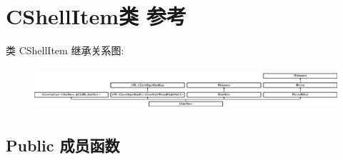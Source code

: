 \hypertarget{class_c_shell_item}{}\section{C\+Shell\+Item类 参考}
\label{class_c_shell_item}
类 C\+Shell\+Item 继承关系图\+:\begin{figure}[H]
\begin{center}
\leavevmode
\includegraphics[height=1.590909cm]{class_c_shell_item}
\end{center}
\end{figure}
\subsection*{Public 成员函数}

